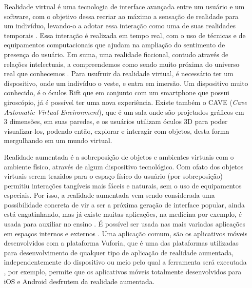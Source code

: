 \documentclass[12pt]{article}
\begin{document}
  \hspace*{5mm}Realidade virtual é uma tecnologia de interface avançada entre um usuário e um software, com o objetivo dessa recriar ao máximo a sensação de realidade para um indivíduo, levando-o a adotar essa interação como uma de suas realidades temporais \cite{livro_IA_BU}. Essa interação é realizada em tempo real, com o uso de técnicas e de equipamentos computacionais que ajudam na ampliação do sentimento de presença do usuário. Em suma, uma realidade ficcional, contudo através de relações intelectuais, a compreendemos como sendo muito próxima do universo real que conhecemos \cite{livro_IA_BU}. Para usufruir da realidade virtual, é necessário ter um dispositivo, onde um indivíduo o veste, e entra em imersão. Um dispositivo muito conhecido, é o óculos Rift que em conjunto com um smartphone que possui giroscópio, já é possível ter uma nova experiência. Existe também o CAVE (\textit{Cave Automatic Virtual Environment}), que é um sala onde são projetados gráficos em 3 dimensões, em suas paredes, e os usuários utilizam óculos 3D para poder visualizar-los, podendo então, explorar e interagir com objetos, desta forma mergulhando em um mundo virtual.\cite{caverna}
  
Realidade aumentada é a sobreposição de objetos e ambientes virtuais com o ambiente físico, através de algum dispositivo tecnológico. Com ofato dos objetos virtuais serem trazidos para o espaço físico do usuário (por sobreposição) permitiu interações tangíveis mais fáceis e naturais, sem o uso de equipamentos especiais. Por isso, a realidade aumentada vem sendo considerada uma possibilidade concreta de vir a ser a próxima geração de interface popular, ainda está engatinhando, mas já existe muitas aplicações, na medicina por exemplo, é usada para auxiliar no ensino \cite{aplicacoes_VR}. É possível ser usada nas mais variadas aplicações em espaços internos e externos \cite{realidadevirtual_e_realidadeaumentada}. Uma aplicação comum, são os aplicativos móveis desenvolvidos com a plataforma Vuforia, que é uma das plataformas utilizadas para desenvolvimento de qualquer tipo de aplicação de realidade aumentada, independentemente do dispositivo ou meio pelo qual a ferramenta será executada \cite{realidadevirtual_e_realidadeaumentada}, por exemplo, permite que os aplicativos móveis totalmente desenvolvidos para iOS e Android desfrutem da realidade aumentada.\cite{site_vuforia}
\end{document}
